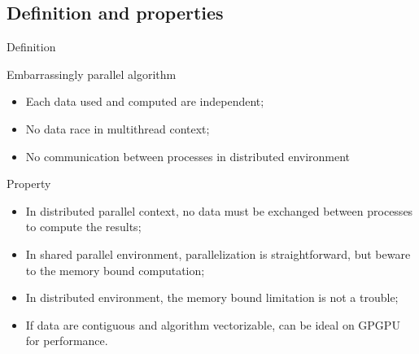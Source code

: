 \documentclass[compress,10pt,aspectratio=169]{beamer}
\begin{document}
\subsection{Definition and properties}
\begin{frame}[fragile]{Definition}
    \scriptsize
    \begin{block}{Embarrassingly parallel algorithm}
        \begin{itemize}
            \item Each data used and computed are independent;
            \item No data race in multithread context;
            \item No communication between processes in distributed environment
        \end{itemize}
    \end{block}

    \begin{exampleblock}{Property}
        \begin{itemize}
            \item In distributed parallel context, no data must be exchanged between processes to compute the results;
            \item In shared parallel environment, parallelization is straightforward, but beware to the memory bound computation;
            \item In distributed environment, the memory bound limitation is not a trouble;
            \item If data are contiguous and algorithm vectorizable, can be ideal on GPGPU for performance.
        \end{itemize}
    \end{exampleblock}
\end{frame}
\end{document}
